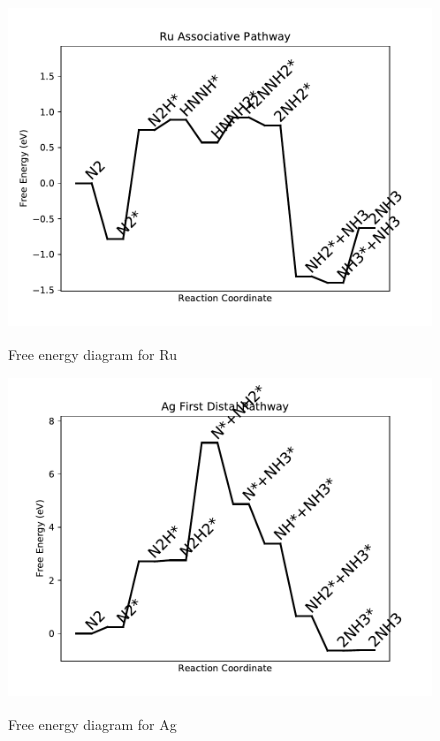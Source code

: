 \documentclass{article}
\begin{document}
\newpage
\begin{figure}
\includegraphics[width=1\linewidth]{data/plots/Ru_associative.pdf}
\label{fig:Ru_associative}
\caption{Free energy diagram for Ru}
\end{figure}

\begin{figure}
\includegraphics[width=1\linewidth]{data/plots/Ag_distal_1.pdf}
\label{fig:Ag_distal_1}
\caption{Free energy diagram for Ag}
\end{figure}
\end{document}
